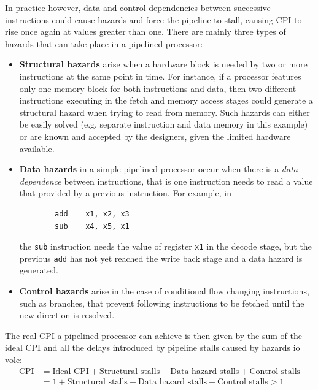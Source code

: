 In practice however, data and control dependencies between successive instructions could cause hazards and force the pipeline to stall, causing CPI to rise once again at values greater than one. There are mainly three types of hazards that can take place in a pipelined processor:
\begin{itemize}
  \item \textbf{Structural hazards} arise when a hardware block is needed by two or more instructions at the same point in time. For instance, if a processor features only one memory block for both instructions and data, then two different instructions executing in the fetch and memory access stages could generate a structural hazard when trying to read from memory. Such hazards can either be easily solved (e.g. separate instruction and data memory in this example) or are known and accepted by the designers, given the limited hardware available.
  \item \textbf{Data hazards} in a simple pipelined processor occur when there is a \emph{data dependence} between instructions, that is one instruction needs to read a value that provided by a previous instruction. For example, in
      \begin{verbatim}
        add    x1, x2, x3
        sub    x4, x5, x1
      \end{verbatim}
      the \texttt{sub} instruction needs the value of register \texttt{x1} in the decode stage, but the previous \texttt{add} has not yet reached the write back stage and a data hazard is generated.
  \item \textbf{Control hazards} arise in the case of conditional flow changing instructions, such as branches, that prevent following instructions to be fetched until the new direction is resolved.
\end{itemize}

The real CPI a pipelined processor can achieve is then given by the sum of the ideal CPI and all the delays introduced by pipeline stalls caused by hazards io vole\cite[p.~168]{hennessy17}:
\begin{equation}\label{eq:pipe_cpi}
  \begin{split}
    \text{CPI}  & = \text{Ideal CPI} + \text{Structural stalls} + \text{Data hazard stalls} + \text{Control stalls} \\
                & = 1 + \text{Structural stalls} + \text{Data hazard stalls} + \text{Control stalls} > 1
  \end{split}
\end{equation}

